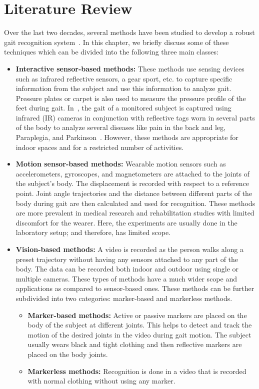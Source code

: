 \chapter{Literature Review} \label{ch:literature_review}
Over the last two decades, several methods have been studied to develop a robust gait recognition system~\cite{Rida_19}. In this chapter, we briefly discuss some of these techniques which can be divided into the following three main classes:

\begin{itemize}
\item \textbf{Interactive sensor-based methods:}
These methods use sensing devices such as infrared reflective sensors, a gear sport, etc. to capture specific information from the subject and use this information to analyze gait. Pressure plates or carpet is also used to measure the pressure profile of the feet during gait. In~\cite{Pogorelc_10}, the gait of a monitored subject is captured using infrared (IR) cameras in conjunction with reflective tags worn in several parts of the body to analyze several diseases like pain in the back and leg, Paraplegia, and Parkinson~\cite{Michele_17}. However, these methods are appropriate for indoor spaces and for a restricted number of activities.

\item \textbf{Motion sensor-based methods:} Wearable motion sensors such as accelerometers, gyroscopes, and magnetometers are attached to the joints of the subject's body. The displacement is recorded with respect to a reference point. Joint angle trajectories and the distance between different parts of the body during gait are then calculated and used for recognition. These methods are more prevalent in medical research and rehabilitation studies with limited discomfort for the wearer. Here, the experiments are usually done in the laboratory setup; and therefore, has limited scope.

\item \textbf{Vision-based methods:} A video is recorded as the person walks along a preset trajectory without having any sensors attached to any part of the body. The data can be recorded both indoor and outdoor using single or multiple cameras. These types of methods have a much wider scope and applications as compared to sensor-based ones. These methods can be further subdivided into two categories: marker-based and markerless methods.
	
	\begin{itemize}
		\item \textbf{Marker-based methods: } Active or passive markers are placed on the body of the subject at different joints. This helps to detect and track the motion of the desired joints in the video during gait motion. The subject usually wears black and tight clothing and then reflective markers are placed on the body joints.
		
		\item \textbf{Markerless methods: } Recognition is done in a video that is recorded with normal clothing without using any marker.  
	\end{itemize}
\end{itemize}

